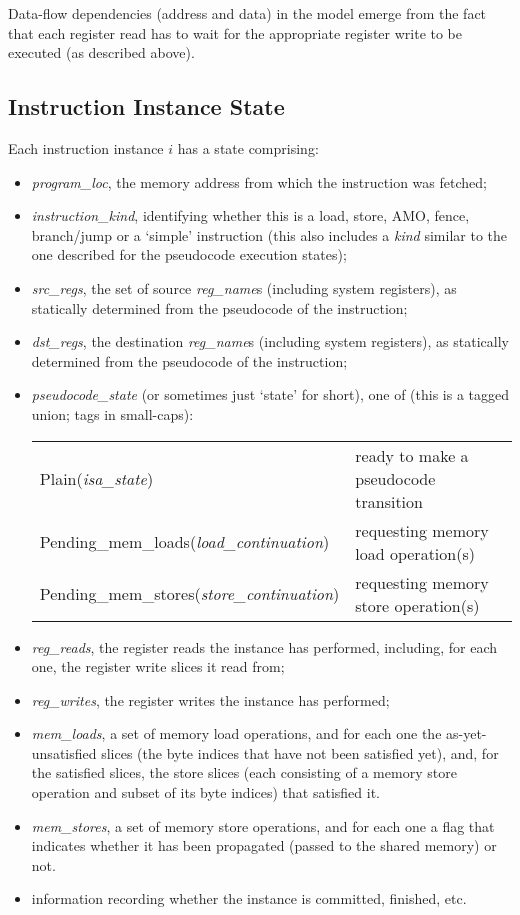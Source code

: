 Data-flow dependencies (address and data) in the model emerge from the
fact that each register read has to wait for the appropriate register write to be executed (as described above).

\subsection{Instruction Instance State}\label{sec:omm:inst_state}
Each instruction instance $i$ has a state comprising:
\begin{itemize}
\item {\it program\_loc}, the memory address from which the instruction was fetched;
\item {\it instruction\_kind}, identifying whether this is a load, store, AMO, fence, branch/jump or a `simple' instruction (this also includes a {\it kind} similar to the one described for the pseudocode execution states);
\item {\it src\_regs}, the set of source {\it reg\_name}s (including system registers), as statically determined from the pseudocode of the instruction;
\item {\it dst\_regs}, the destination {\it reg\_name}s (including system registers), as statically determined from the pseudocode of the instruction;
\item {\it pseudocode\_state} (or sometimes just `state' for short), one of (this is a tagged union; tags in small-caps):
  \begin{center}
  \begin{tabular}{l@{ \quad-\quad }l}
  {\sc Plain}({\it isa\_state})
    & ready to make a pseudocode transition \\
  {\sc Pending\_mem\_loads}({\it load\_continuation})
    & requesting memory load operation(s) \\
  {\sc Pending\_mem\_stores}({\it store\_continuation})
    & requesting memory store operation(s) \\
  \end{tabular}
  \end{center}

\item {\it reg\_reads}, the register reads the instance has performed, including, for each one, the register write slices it read from;
\item {\it reg\_writes}, the register writes the instance has performed;
\item {\it mem\_loads}, a set of memory load operations, and for each one
  the as-yet-unsatisfied slices (the byte indices that have not been
  satisfied yet), and, for the satisfied slices, the store slices
  (each consisting of a memory store operation and subset of its byte indices) that satisfied it.
\item {\it mem\_stores}, a set of memory store operations, and for each one a flag that indicates whether it has been propagated (passed to the shared memory) or not.
\item information recording whether the instance is committed, finished, etc.
\end{itemize}

